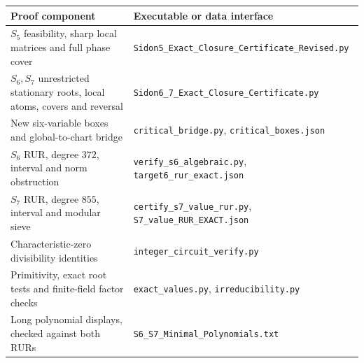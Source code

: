 \documentclass[11pt]{article}
\begin{document}
\begin{center}\small
\begin{tabular}{p{.46\linewidth}p{.46\linewidth}}
\toprule Proof component&Executable or data interface\\\midrule
$S_5$ feasibility, sharp local matrices and full phase cover&
\texttt{Sidon5\_Exact\_Closure\_\allowbreak Certificate\_Revised.py}\\
$S_6,S_7$ unrestricted stationary roots, local atoms, covers and reversal&
\texttt{Sidon6\_7\_Exact\_Closure\_Certificate.py}\\
New six-variable boxes and global-to-chart bridge&
\texttt{critical\_bridge.py}, \texttt{critical\_boxes.json}\\
$S_6$ RUR, degree $372$, interval and norm obstruction&
\texttt{verify\_s6\_algebraic.py}, \texttt{target6\_rur\_exact.json}\\
$S_7$ RUR, degree $855$, interval and modular sieve&
\texttt{certify\_s7\_value\_rur.py}, \texttt{S7\_value\_RUR\_EXACT.json}\\
Characteristic-zero divisibility identities&
\texttt{integer\_circuit\_verify.py}\\
Primitivity, exact root tests and finite-field factor checks&
\texttt{exact\_values.py}, \texttt{irreducibility.py}\\
Long polynomial displays, checked against both RURs&
\texttt{S6\_S7\_Minimal\_Polynomials.txt}\\\bottomrule
\end{tabular}
\end{center}
\end{document}
